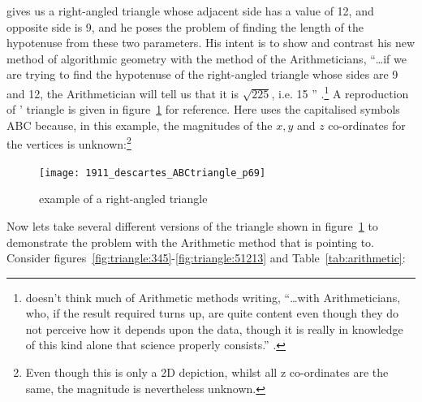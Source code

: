 \documentclass[a4paper, 12pt]{article}
\begin{document}
\citeauthor{descartes_philosophical_1911} gives us a right-angled triangle whose adjacent side has a value of 12, and opposite side is 9, and he poses the problem of finding the length of the hypotenuse from these two parameters. His intent is to show and contrast his new method of algorithmic geometry with the method of the Arithmeticians, ``\dots if we are trying to find the hypotenuse of the right-angled triangle whose sides are 9 and 12, the Arithmetician will tell us that it is \(\sqrt{225}\), i.e. 15 '' \citeyearpar[Rule~XVI, p.~67]{descartes_philosophical_1911}.\footnote{\citeauthor{descartes_philosophical_1911} doesn't think much of Arithmetic methods writing, ``\dots with Arithmeticians, who, if the result required turns up, are quite content even though they do not perceive how it depends upon the data, though it is really in knowledge of this kind alone that science properly consists.'' \citeyearpar[Rule~XVI, p.~69]{descartes_philosophical_1911}.} A reproduction of \citeauthor{descartes_philosophical_1911}' triangle is given in figure~\ref{fig:triangle:91215} for reference. Here \citeauthor{descartes_philosophical_1911} uses the capitalised symbols ABC because, in this example, the magnitudes of the \(x,y\) and \(z\) co-ordinates for the vertices is unknown:\footnote{Even though this is only a 2D depiction, whilst all z co-ordinates are the same, the magnitude is nevertheless unknown.} 
 
\begin{figure}[ht!]
    \centering
    \texttt{[image: 1911\_descartes\_ABCtriangle\_p69]}
    \caption{\citeauthor{descartes_philosophical_1911} example of a right-angled triangle \citeyearpar[p.~69]{descartes_philosophical_1911}}
    \label{fig:triangle:91215}
\end{figure}

Now lets take several different versions of the triangle shown in figure~\ref{fig:triangle:91215} to demonstrate the problem with the Arithmetic method that \citeauthor{descartes_philosophical_1911} is pointing to. Consider figures~\ref{fig:triangle:345}-\ref{fig:triangle:51213} and Table~\ref{tab:arithmetic}:
\end{document}
